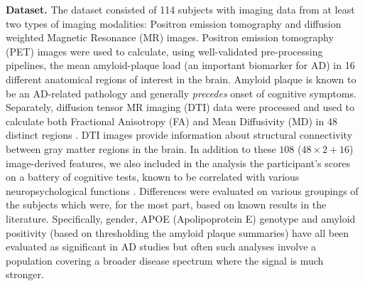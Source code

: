 {\bf Dataset.} The dataset consisted of 114 subjects with imaging data from at least two types of imaging modalities: Positron emission tomography and 
diffusion weighted Magnetic Resonance (MR) images. 
Positron emission tomography (PET) images were used to calculate, using well-validated pre-processing pipelines, 
the mean amyloid-plaque load (an important biomarker for AD) in 16 different anatomical regions of interest in the brain. 
Amyloid plaque is known to be an AD-related pathology and generally {\em precedes} onset of cognitive symptoms. 
Separately, diffusion tensor MR imaging (DTI) data were processed and used to calculate both Fractional Anisotropy (FA) and Mean Diffusivity (MD) in 48 distinct regions \cite{mori2008stereotaxic}. 
DTI images provide information about structural connectivity between gray matter regions in the brain. 
In addition to these $108$ ($48 \times 2 + 16$) image-derived features, 
we also included in the analysis the participant's scores on a battery of cognitive tests, known to be correlated with various neuropsychological functions \cite{lezak2004neuropsychological}. 
Differences were evaluated on various groupings of the subjects which were, for the most part, 
based on known results in the literature.   
Specifically, gender, APOE (Apolipoprotein E) genotype and amyloid positivity (based on thresholding the amyloid plaque summaries) have 
all been evaluated as significant in
AD studies \cite{racine2014associations} but often such analyses involve a population covering a broader disease spectrum where 
the signal is much stronger. 
%

